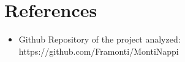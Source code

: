 \section{References}

\begin{itemize}
\item Github Repository of the project analyzed: https://github.com/Framonti/MontiNappi
\end{itemize}
